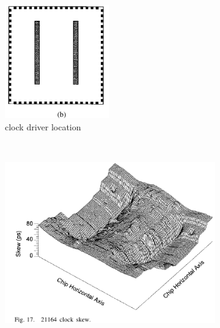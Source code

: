 \documentclass[11pt]{article}
\begin{document}
\begin{figure}[h]
	\centering
	\begin{subfigure}[b]{0.3\textwidth}
		\includegraphics[width=\textwidth]{21164_1.png}
		\caption{clock driver location}
	\end{subfigure}
	~ %
	\begin{subfigure}[b]{0.3\textwidth}
		\includegraphics[width=\textwidth]{21164_2.png}

\end{subfigure}
\end{figure}
\end{document}
